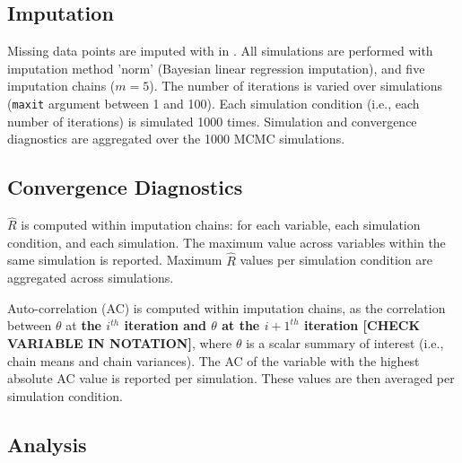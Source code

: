 \documentclass[article]{jss}
\begin{document}
\subsection{Imputation}
Missing data points are imputed with  in . All simulations are performed with imputation method 'norm' (Bayesian linear regression imputation), and five imputation chains ($m = 5$). The number of iterations is varied over simulations (\texttt{maxit} argument between 1 and 100). Each simulation condition (i.e., each number of iterations) is simulated 1000 times. Simulation and convergence diagnostics are aggregated over the 1000 MCMC simulations. 

\subsection{Convergence Diagnostics}

$\widehat{R}$ is computed within imputation chains: for each variable, each simulation condition, and each simulation. The maximum value across variables within the same simulation is reported. Maximum $\widehat{R}$ values per simulation condition are aggregated across simulations.

Auto-correlation (AC) is computed within imputation chains, as the correlation between $\theta$ at \textbf{the $i^{th}$ iteration and $\theta$ at the $i+1^{th}$ iteration [CHECK VARIABLE IN NOTATION]}, where $\theta$ is a scalar summary of interest (i.e., chain means and chain variances). The AC of the variable with the highest absolute AC value is reported per simulation. These values are then averaged per simulation condition.


\subsection{Analysis}
\end{document}
